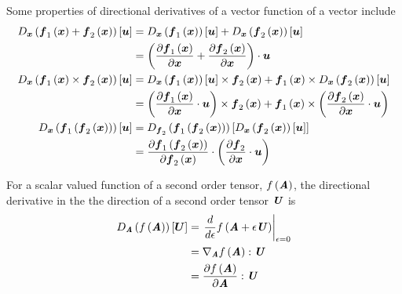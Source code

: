 Some properties of directional derivatives of a vector function of a vector include
\begin{align}
  \directionalderiv{\vectr{x}}{\fnof{\vectr{f}_{1}}{\vectr{x}}
    +\fnof{\vectr{f}_{2}}{\vectr{x}}}{\vectr{u}}
  &=\directionalderiv{\vectr{x}}{\fnof{\vectr{f}_{1}}{\vectr{x}}}{\vectr{u}}
  +\directionalderiv{\vectr{x}}{\fnof{\vectr{f}_{2}}{\vectr{x}}}{\vectr{u}}
  \nonumber \\
  &=\dotprod{\pbrac{\delby{\fnof{\vectr{f}_{1}}{\vectr{x}}}{\vectr{x}}
      +\delby{\fnof{\vectr{f}_{2}}{\vectr{x}}}{\vectr{x}}}}{\vectr{u}}
  \label{eqn:AdditionRuleDirectDerivVectorValueVectorFunction} \\
  \directionalderiv{\vectr{x}}{\crossprod{\fnof{\vectr{f}_{1}}{\vectr{x}}}{\fnof{\vectr{f}_{2}}{\vectr{x}}}}{\vectr{u}}
  &=\crossprod{\directionalderiv{\vectr{x}}{\fnof{\vectr{f}_{1}}{\vectr{x}}}{\vectr{u}}}{\fnof{\vectr{f}_{2}}{\vectr{x}}}
  +\crossprod{\fnof{\vectr{f}_{1}}{\vectr{x}}}{\directionalderiv{\vectr{x}}{\fnof{\vectr{f}_{2}}{\vectr{x}}}{\vectr{u}}}
  \nonumber \\
  &=\crossprod{\pbrac{\dotprod{\delby{\fnof{\vectr{f}_{1}}{\vectr{x}}}{\vectr{x}}}{\vectr{u}}}}{\fnof{\vectr{f}_{2}}{\vectr{x}}}
  +\crossprod{\fnof{\vectr{f}_{1}}{\vectr{x}}}{\pbrac{\dotprod{\delby{\fnof{\vectr{f}_{2}}{\vectr{x}}}{\vectr{x}}}{\vectr{u}}}}
  \label{eqn:ProductRuleDirectDerivVectorValueVectorFunction} \\
  \directionalderiv{\vectr{x}}{\fnof{\vectr{f}_{1}}{\fnof{\vectr{f}_{2}}{\vectr{x}}}}{\vectr{u}}
  &=\directionalderiv{\vectr{f}_{2}}{\fnof{\vectr{f}_{1}}{\fnof{\vectr{f}_{2}}{\vectr{x}}}}{\directionalderiv{\vectr{x}}{\fnof{\vectr{f}_{2}}{\vectr{x}}}{\vectr{u}}}
  \nonumber \\
  &=\dotprod{\delby{\fnof{\vectr{f}_{1}}{\fnof{\vectr{f}_{2}}{\vectr{x}}}}{\fnof{\vectr{f}_{2}}{\vectr{x}}}}{\pbrac{\dotprod{\delby{\vectr{f}_{2}}{\vectr{x}}}{\vectr{u}}}}
  \label{eqn:ChainRuleDirectDerivVectorValueVectorFunction} 
\end{align}

For a scalar valued function of a second order tensor, $ f\left( \boldsymbol{\mathit{A}} \right) $,
the directional derivative in the the direction of a second order tensor
$\boldsymbol{\mathit{U}}$ is
\begin{equation}
  \begin{split}
    \directionalderiv{\tensor{A}}{\fnof{f}{\tensor{A}}}{\vectr{U}}
    &=\evalat{\dfrac{d}{d\epsilon}\fnof{f}{\tensor{A}+\epsilon\tensor{U}}}{\epsilon=0}\\
    &=\doubledotprod{\gradient{\tensor{A}}{\fnof{f}{\tensor{A}}}}{\tensor{U}}\\
    &=\doubledotprod{\delby{\fnof{f}{\tensor{A}}}{\tensor{A}}}{\tensor{U}}\\
  \end{split}  
\end{equation}

